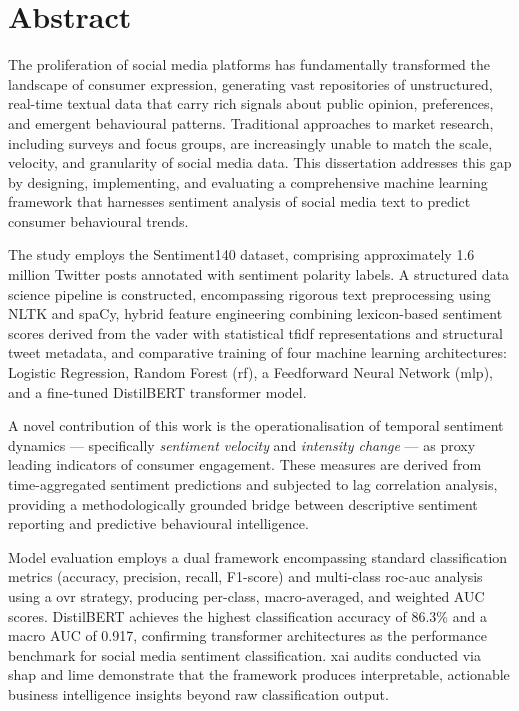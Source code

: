\chapter*{Abstract}

The proliferation of social media platforms has fundamentally transformed the landscape of consumer expression, generating vast repositories of unstructured, real-time textual data that carry rich signals about public opinion, preferences, and emergent behavioural patterns. Traditional approaches to market research, including surveys and focus groups, are increasingly unable to match the scale, velocity, and granularity of social media data. This dissertation addresses this gap by designing, implementing, and evaluating a comprehensive machine learning framework that harnesses sentiment analysis of social media text to predict consumer behavioural trends.

The study employs the Sentiment140 dataset, comprising approximately 1.6 million Twitter posts annotated with sentiment polarity labels. A structured data science pipeline is constructed, encompassing rigorous text preprocessing using NLTK and spaCy, hybrid feature engineering combining lexicon-based sentiment scores derived from the \gls{vader} with statistical \gls{tfidf} representations and structural tweet metadata, and comparative training of four machine learning architectures: Logistic Regression, Random Forest (\gls{rf}), a Feedforward Neural Network (\gls{mlp}), and a fine-tuned DistilBERT transformer model.

A novel contribution of this work is the operationalisation of temporal sentiment dynamics --- specifically \emph{sentiment velocity} and \emph{intensity change} --- as proxy leading indicators of consumer engagement. These measures are derived from time-aggregated sentiment predictions and subjected to lag correlation analysis, providing a methodologically grounded bridge between descriptive sentiment reporting and predictive behavioural intelligence.

Model evaluation employs a dual framework encompassing standard classification metrics (accuracy, precision, recall, F1-score) and multi-class \gls{roc}-\gls{auc} analysis using a \gls{ovr} strategy, producing per-class, macro-averaged, and weighted AUC scores. DistilBERT achieves the highest classification accuracy of 86.3\% and a macro AUC of 0.917, confirming transformer architectures as the performance benchmark for social media sentiment classification. \gls{xai} audits conducted via \gls{shap} and \gls{lime} demonstrate that the framework produces interpretable, actionable business intelligence insights beyond raw classification output.

